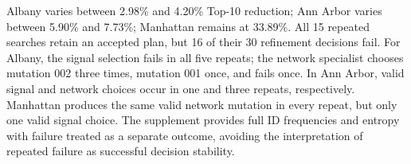 Albany varies between 2.98\% and 4.20\% Top-10 reduction; Ann Arbor varies between 5.90\% and 7.73\%; Manhattan remains at 33.89\%. All 15 repeated searches retain an accepted plan, but 16 of their 30 refinement decisions fail. For Albany, the signal selection fails in all five repeats; the network specialist chooses mutation 002 three times, mutation 001 once, and fails once. In Ann Arbor, valid signal and network choices occur in one and three repeats, respectively. Manhattan produces the same valid network mutation in every repeat, but only one valid signal choice. The supplement provides full ID frequencies and entropy with failure treated as a separate outcome, avoiding the interpretation of repeated failure as successful decision stability.
